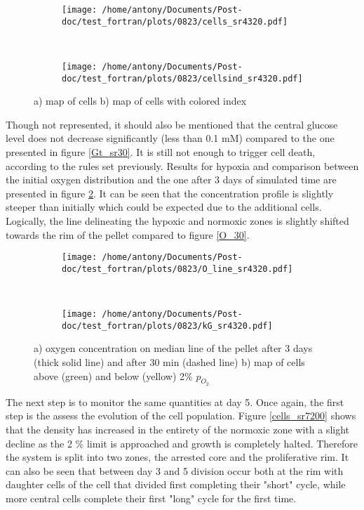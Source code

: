 \documentclass[11pt,a4paper]{article}
\begin{document}
\begin{figure}[ht!]
	\begin{subfigure}{0.45\textwidth}
	\centering
	\texttt{[image: /home/antony/Documents/Post-doc/test\_fortran/plots/0823/cells\_sr4320.pdf]}
	\caption{ }
	\end{subfigure}
	~~ \hspace{1cm}
	\begin{subfigure}{0.45\textwidth}
	\texttt{[image: /home/antony/Documents/Post-doc/test\_fortran/plots/0823/cellsind\_sr4320.pdf]}
		\caption{ }
	\end{subfigure}
	\caption{a) map of cells b) map of cells with colored index \label{cells_sr4320}}
	\end{figure}
	
Though not represented, it should also be mentioned that the central glucose level does not decrease significantly (less than 0.1 mM) compared to the one presented in figure \ref{Gt_sr30}. It is still not enough to trigger cell death, according to the rules set previously. Results for hypoxia and comparison between the initial oxygen distribution and the one after 3 days of simulated time are presented in figure \ref{O_sr4320}. It can be seen that the concentration profile is slightly steeper than initially which could be expected due to the additional cells. Logically, the line delineating the hypoxic and normoxic zones is slightly shifted towards the rim of the pellet compared to figure \ref{O_30}.\\

\begin{figure}[ht!]
	\begin{subfigure}{0.45\textwidth}
	\centering
	\texttt{[image: /home/antony/Documents/Post-doc/test\_fortran/plots/0823/O\_line\_sr4320.pdf]}
	\caption{ }
	\end{subfigure}
	~~ \hspace{1cm}
	\begin{subfigure}{0.45\textwidth}
	\texttt{[image: /home/antony/Documents/Post-doc/test\_fortran/plots/0823/kG\_sr4320.pdf]}
		\caption{ }
	\end{subfigure}
	\caption{a) oxygen concentration on median line of the pellet after 3 days (thick solid line) and after 30 min (dashed line) b) map of cells above (green) and below (yellow) 2\% $p_{O_2}$\label{O_sr4320}}
	\end{figure}
	
The next step is to monitor the same quantities at day 5. Once again, the first step is the assess the evolution of the cell population. Figure \ref{cells_sr7200} shows that the density has increased in the entirety of the normoxic zone with a slight decline as the 2 \% limit is approached and growth is completely halted. Therefore the system is split into two zones, the arrested core and the proliferative rim. It can also be seen that between day 3 and 5 division occur both at the rim with daughter cells of the cell that divided first completing their "short" cycle, while more central cells complete their first "long" cycle for the first time.\\
	
\end{document}

